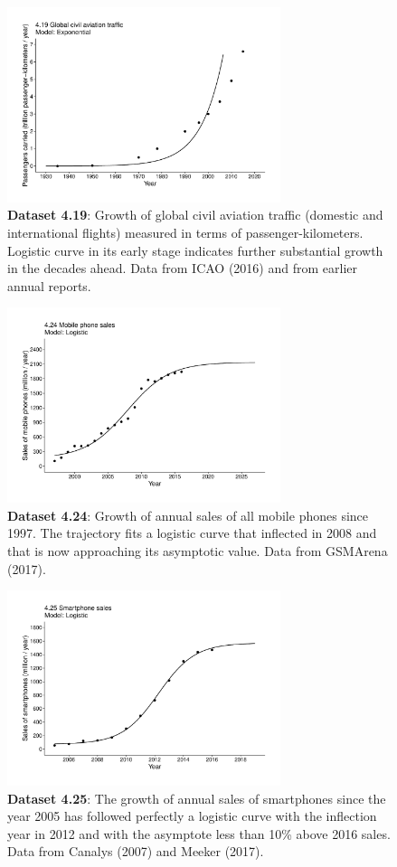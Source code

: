 \documentclass[aps,rmp,preprint,superscriptaddress,10pt,onecolumn]{article}
\begin{document}
\begin{figure}[h]
\includegraphics[width=8cm]{output/figs-ggplot/4.19.pdf}
\caption{\textbf{Dataset 4.19}: Growth of global civil aviation traffic (domestic and international flights) measured in terms of passenger-kilometers. Logistic curve in its early stage indicates further substantial growth in the decades ahead. Data from ICAO (2016) and from earlier annual reports. }
\end{figure}
	
\begin{figure}[h]
\includegraphics[width=8cm]{output/figs-ggplot/4.24.pdf}
\caption{\textbf{Dataset 4.24}: Growth of annual sales of all mobile phones since 1997. The trajectory fits a logistic curve that inflected in 2008 and that is now approaching its asymptotic value. Data from GSMArena (2017).}
\end{figure}
	
\begin{figure}[h]
\includegraphics[width=8cm]{output/figs-ggplot/4.25.pdf}
\caption{\textbf{Dataset 4.25}: The growth of annual sales of smartphones since the year 2005 has followed perfectly a logistic curve with the inflection year in 2012 and with the asymptote less than 10\% above 2016 sales. Data from Canalys (2007) and Meeker (2017).}
\end{figure}
	
\end{document}
